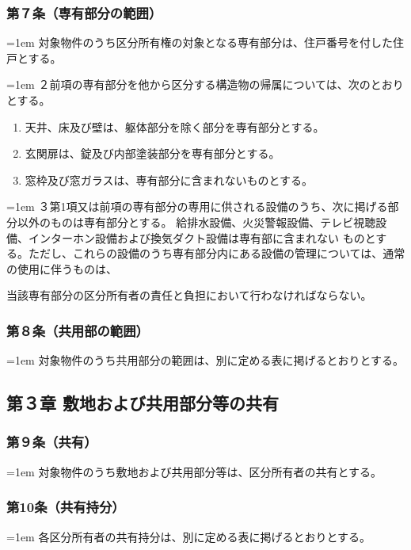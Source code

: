 \documentclass[
  luatex,
  paper=a4paper,
  fontsize=11pt,
  jafontsize=11pt,
  jlreq_notes,
]{jlreq}
\newcommand{\joumain}[1]{%
  \noindent\hangindent=1em\hangafter=1
  \hspace{1em}#1%
}
\newcommand{\kou}[2]{%
  \par\noindent\hangindent=1em\hangafter=1
  #1\hspace{1em}#2%
}
\begin{document}
  \subsubsection*{ 第７条（専有部分の範囲）}
  \joumain{対象物件のうち区分所有権の対象となる専有部分は、住戸番号を付した住戸とする。}
  \kou{２}{前項の専有部分を他から区分する構造物の帰属については、次のとおりとする。}
  \begin{enumerate}
    \item 天井、床及び壁は、躯体部分を除く部分を専有部分とする。
    \item 玄関扉は、錠及び内部塗装部分を専有部分とする。
    \item 窓枠及び窓ガラスは、専有部分に含まれないものとする。 
  \end{enumerate}
  \kou{３}{第1項又は前項の専有部分の専用に供される設備のうち、次に掲げる部分以外のものは専有部分とする。
  給排水設備、火災警報設備、テレビ視聴設備、インターホン設備および換気ダクト設備は専有部に含まれない
  ものとする。ただし、これらの設備のうち専有部分内にある設備の管理については、通常の使用に伴うものは、}
  当該専有部分の区分所有者の責任と負担において行わなければならない。

  \subsubsection*{第８条（共用部の範囲）}
  \joumain{対象物件のうち共用部分の範囲は、別に定める表に掲げるとおりとする。}
  
  \begin{center}
    \subsection*{第３章 敷地および共用部分等の共有}
  \end{center}

  \subsubsection*{第９条（共有）}
  \joumain{対象物件のうち敷地および共用部分等は、区分所有者の共有とする。}

  \subsubsection*{第10条（共有持分）}
  \joumain{各区分所有者の共有持分は、別に定める表に掲げるとおりとする。}
\end{document}
